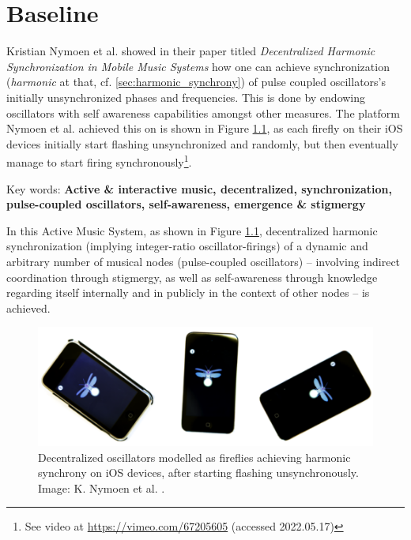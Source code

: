 \chapter{Baseline}
\label{chap:baseline}



Kristian Nymoen et al. showed in their paper titled \textit{Decentralized Harmonic Synchronization in Mobile Music Systems} \cite{nymoen_synch} how one can achieve synchronization (\textit{harmonic} at that, cf. \ref{sec:harmonic_synchrony}) of pulse coupled oscillators's initially unsynchronized phases and frequencies. This is done by endowing oscillators with self awareness capabilities amongst other measures. The platform Nymoen et al. achieved this on is shown in Figure \ref{fig:nymoen_fireflies_on_ios_devices}, as each firefly on their iOS devices initially start flashing unsynchronized and randomly, but then eventually manage to start firing synchronously\footnote{See video at \url{https://vimeo.com/67205605} (accessed 2022.05.17)}.

Key words: \textbf{Active \& interactive music, decentralized, synchronization, pulse-coupled oscillators, self-awareness, emergence \& stigmergy}
\newline

In this Active Music System, as shown in Figure \ref{fig:nymoen_fireflies_on_ios_devices}, decentralized harmonic synchronization (implying integer-ratio oscillator-firings) of a dynamic and arbitrary number of musical nodes (pulse-coupled oscillators) -- involving indirect coordination through stigmergy, as well as self-awareness through knowledge regarding itself internally and in publicly in the context of other nodes -- is achieved.
\newline

\begin{figure}[ht!]
	\centering
	\includegraphics[width=0.7\linewidth]{Assets/DocSegments/Chapters/Baseline/Figures/Illustrations/fireflies_on_ios_devices.png}
	\caption[]{Decentralized oscillators modelled as fireflies achieving harmonic synchrony on iOS devices, after starting flashing unsynchronously. Image: K. Nymoen et al. \cite{nymoen_synch}.}
	\label{fig:nymoen_fireflies_on_ios_devices}
\end{figure}

